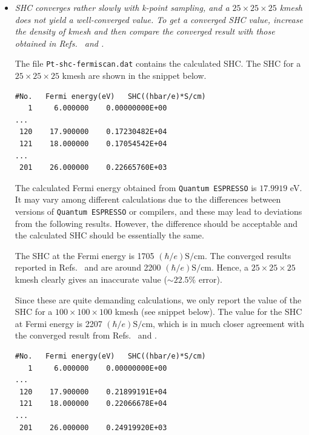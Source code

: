 \begin{itemize}
	\item {\it SHC converges rather slowly with k-point sampling, and a $25 \times 25 \times 25$ kmesh does not yield a well-converged value.
	To get a converged SHC value, increase the density of kmesh and
	then compare the converged result with those obtained in
	Refs.~ and .}

	The file {\tt Pt-shc-fermiscan.dat} contains the calculated SHC.
	The SHC for a $25\times25\times25$ kmesh are shown in the snippet below.

\begin{tcolorbox}[title=$25\times25\times25$ kmesh,sharp corners,boxrule=0.5pt]
{\small
\begin{verbatim}
#No.   Fermi energy(eV)   SHC((hbar/e)*S/cm)
   1     6.000000    0.00000000E+00
...
 120    17.900000    0.17230482E+04
 121    18.000000    0.17054542E+04
...
 201    26.000000    0.22665760E+03
\end{verbatim}
}
\end{tcolorbox}

The calculated Fermi energy obtained from {\tt Quantum ESPRESSO} is $17.9919$ eV.
It may vary among different calculations due to the differences between versions of {\tt Quantum ESPRESSO} or compilers,
and these may lead to deviations from the following results.
However, the difference should be acceptable and the calculated SHC should be essentially the same.

The SHC at the Fermi energy is 1705 $(\hbar/e)\mathrm{S/cm}$.
The converged results reported in Refs.~
and  are around 2200 $(\hbar/e)\mathrm{S/cm}$.
Hence, a $25\times25\times25$ kmesh clearly gives an inaccurate value ($\sim 22.5\%$ error).

Since these are quite demanding calculations, we only report the
value of the SHC for a $100\times100\times100$ kmesh (see snippet below).
The value for the SHC at Fermi energy is 2207 $(\hbar/e)\mathrm{S/cm}$, which is
in much closer agreement with the converged result from
Refs.~ and .

\begin{tcolorbox}[title=$100\times100\times100$ kmesh,sharp corners,boxrule=0.5pt]
{\small
\begin{verbatim}
#No.   Fermi energy(eV)   SHC((hbar/e)*S/cm)
   1     6.000000    0.00000000E+00
...
 120    17.900000    0.21899191E+04
 121    18.000000    0.22066678E+04
...
 201    26.000000    0.24919920E+03
\end{verbatim}
}
\end{tcolorbox}


\end{itemize}
